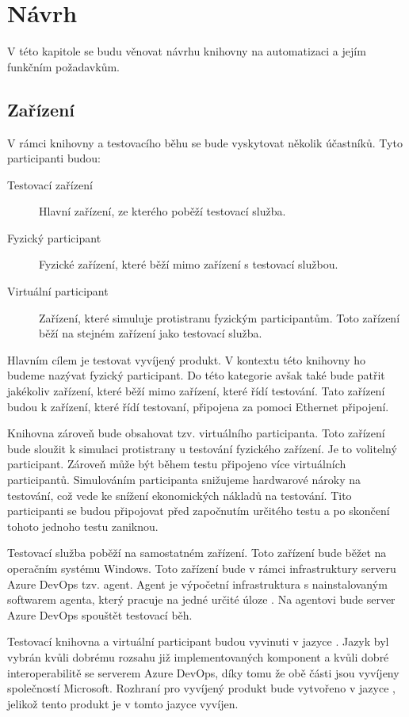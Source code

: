 \chapter{Návrh}

V této kapitole se budu věnovat návrhu knihovny na automatizaci a jejím funkčním požadavkům.

\section{Zařízení}
V rámci knihovny a testovacího běhu se bude vyskytovat několik účastníků. Tyto participanti budou:

\begin{description}
    \item[Testovací zařízení] Hlavní zařízení, ze kterého poběží testovací služba.
    \item[Fyzický participant] Fyzické zařízení, které běží mimo zařízení s testovací službou. 
    \item[Virtuální participant] Zařízení, které simuluje protistranu fyzickým participantům. Toto zařízení běží na stejném zařízení jako testovací služba.
\end{description}

Hlavním cílem je testovat vyvíjený produkt. V kontextu této knihovny ho budeme nazývat fyzický participant. Do této kategorie avšak také bude patřit jakékoliv zařízení, které běží mimo zařízení, které řídí testování. Tato zařízení budou k zařízení, které řídí testovaní, připojena za pomoci Ethernet připojení.

Knihovna zároveň bude obsahovat tzv. virtuálního participanta. Toto zařízení bude sloužit k simulaci protistrany u testování fyzického zařízení. Je to volitelný participant. Zároveň může být během testu připojeno více virtuálních participantů. Simulováním participanta snižujeme hardwarové nároky na testování, což vede ke snížení ekonomických nákladů na testování. Tito participanti se budou připojovat před započnutím určitého testu a po skončení tohoto jednoho testu zaniknou.

Testovací služba poběží na samostatném zařízení. Toto zařízení bude běžet na operačním systému Windows. Toto zařízení bude v rámci infrastruktury serveru Azure DevOps tzv. agent. Agent je výpočetní infrastruktura s nainstalovaným softwarem agenta, který pracuje na jedné určité úloze \cite{agent_docs}. Na agentovi bude server Azure DevOps spouštět testovací běh.

Testovací knihovna a virtuální participant budou vyvinuti v jazyce . Jazyk byl vybrán kvůli dobrému rozsahu již implementovaných komponent a kvůli dobré interoperabilitě se serverem Azure DevOps, díky tomu že obě části jsou vyvíjeny společností Microsoft. Rozhraní pro vyvíjený produkt bude vytvořeno v jazyce , jelikož tento produkt je v tomto jazyce vyvíjen.

